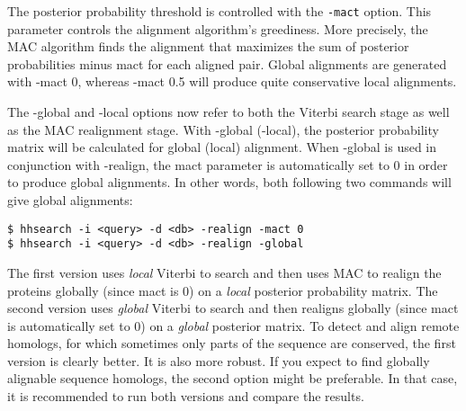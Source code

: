 \documentclass[11pt,a4paper]{article}
\begin{document}
The posterior probability threshold is controlled with the \verb`-mact` option. 
This parameter controls the alignment algorithm's greediness. More precisely, the 
MAC algorithm finds the alignment that maximizes the sum of posterior probabilities 
minus mact for each aligned pair. Global alignments are generated with -mact 0, 
whereas -mact 0.5 will produce quite conservative local alignments. 

The -global and -local options now refer to both the Viterbi search stage as 
well as the MAC realignment stage. With -global (-local), the posterior probability 
matrix will be calculated for global (local) alignment. When -global is used in 
conjunction with -realign, the mact parameter is automatically set to 0 in order to 
produce global alignments. In other words, both following two commands will give 
global alignments:
\begin{verbatim}
$ hhsearch -i <query> -d <db> -realign -mact 0
$ hhsearch -i <query> -d <db> -realign -global
\end{verbatim}

The first version uses \emph{local} Viterbi to search and then uses MAC to realign the 
proteins globally (since mact is 0) on a \emph{local} posterior probability matrix. The 
second version uses \emph{global} Viterbi to search and then realigns globally (since mact 
is automatically set to 0) on a \emph{global} posterior matrix. To detect and align remote 
homologs, for which sometimes only parts of the sequence are conserved, the first 
version is clearly better. It is also more robust. If you expect to find globally 
alignable sequence homologs, the second option might be preferable. In that case, 
it is recommended to run both versions and compare the results. 
\end{document}
